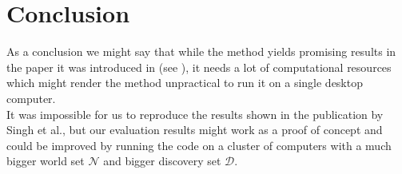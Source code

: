 \section{Conclusion}

As a conclusion we might say that while the method yields promising results in the paper it was introduced in 
(see \cite{Singh2012DiscPat}), it needs a lot of computational resources which might render the method unpractical to run it on a single desktop computer.\\

It was impossible for us to reproduce the results shown in the publication by Singh et al., but our evaluation results
might work as a proof of concept and could be improved by running the code on a cluster of computers with a much bigger
world set $\mathcal{N}$ and bigger discovery set $\mathcal{D}$.\\

